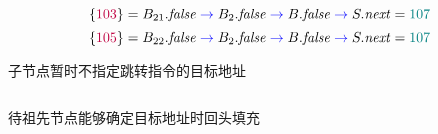 \begin{frame}{}
\end{frame}

\begin{frame}{}
  \begin{center}


    \vspace{-0.60cm}
    \pause
    \[
      \{\textcolor{purple}{103}\} = B_{21}.\mathit{false} \textcolor{blue}{\;\to\;} B_{2}.\mathit{false} \textcolor{blue}{\;\to\;} B.\mathit{false} \textcolor{blue}{\;\to\;} S.\mathit{next} = \textcolor{teal}{107}
    \]
    \[
      \{\textcolor{purple}{105}\} = B_{22}.\mathit{false} \textcolor{blue}{\;\to\;} B_{2}.\mathit{false} \textcolor{blue}{\;\to\;} B.\mathit{false} \textcolor{blue}{\;\to\;} S.\mathit{next} = \textcolor{teal}{107}
    \]
  \end{center}
\end{frame}





\begin{frame}{}
  \begin{center}
    子节点暂时不指定跳转指令的目标地址
  \end{center}

  \begin{columns}
  \end{columns}

  \vspace{0.50cm}
  \begin{center}
    待祖先节点能够确定目标地址时回头填充
  \end{center}
\end{frame}


